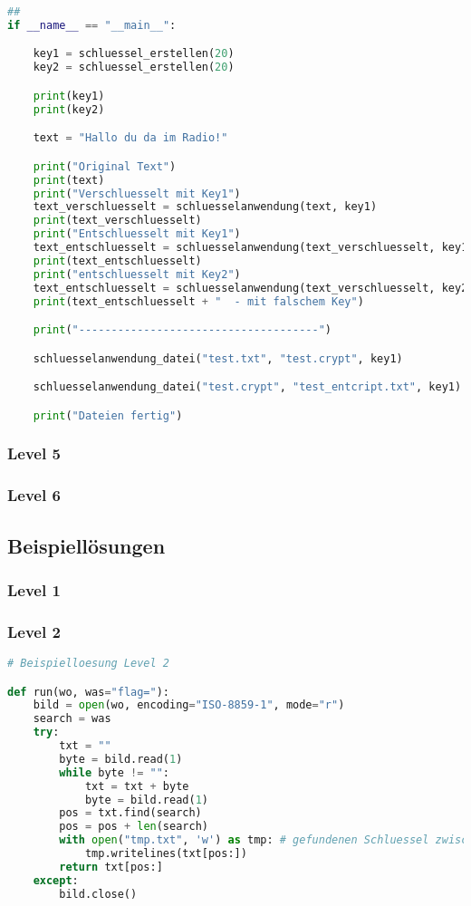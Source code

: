 \documentclass[a4paper 11pt]{article}
\begin{document}
\begin{lstlisting}[language=python, caption=Funktionalitäten für Level 4]
##
if __name__ == "__main__":

	key1 = schluessel_erstellen(20)
	key2 = schluessel_erstellen(20)

	print(key1)
	print(key2)

	text = "Hallo du da im Radio!"

	print("Original Text")
	print(text)
	print("Verschluesselt mit Key1")
	text_verschluesselt = schluesselanwendung(text, key1)
	print(text_verschluesselt)
	print("Entschluesselt mit Key1")
	text_entschluesselt = schluesselanwendung(text_verschluesselt, key1)
	print(text_entschluesselt)
	print("entschluesselt mit Key2")
	text_entschluesselt = schluesselanwendung(text_verschluesselt, key2)
	print(text_entschluesselt + "  - mit falschem Key")

	print("-------------------------------------")

	schluesselanwendung_datei("test.txt", "test.crypt", key1)

	schluesselanwendung_datei("test.crypt", "test_entcript.txt", key1)

	print("Dateien fertig")
\end{lstlisting}
\flushleft

\subsubsection{Level 5}
\subsubsection{Level 6}

\subsection{Beispiellösungen}
\subsubsection{Level 1}
\subsubsection{Level 2}
\begin{lstlisting}[language=python, caption=Beispiellösung Aufgabe 2]
# Beispielloesung Level 2

def run(wo, was="flag="):
    bild = open(wo, encoding="ISO-8859-1", mode="r")
    search = was
    try:
        txt = ""
        byte = bild.read(1)
        while byte != "":
            txt = txt + byte
            byte = bild.read(1)
        pos = txt.find(search)
        pos = pos + len(search)
        with open("tmp.txt", 'w') as tmp: # gefundenen Schluessel zwischenspeichern
            tmp.writelines(txt[pos:])
        return txt[pos:]
    except:
        bild.close()
\end{lstlisting}
\flushleft
\end{document}
